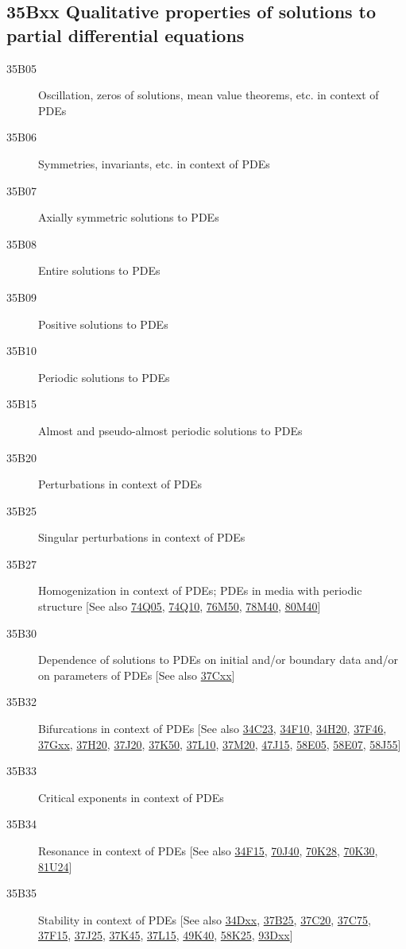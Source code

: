 \subsection*{35Bxx  Qualitative properties of solutions to partial differential equations }\label{35Bxx}
\begin{description}  
\item [35B05]\label{35B05} Oscillation, zeros of solutions, mean value theorems, etc. in context of PDEs
\item [35B06]\label{35B06} Symmetries, invariants, etc. in context of PDEs 
\item [35B07]\label{35B07} Axially symmetric solutions to PDEs
\item [35B08]\label{35B08} Entire solutions to PDEs
\item [35B09]\label{35B09} Positive solutions to PDEs
\item [35B10]\label{35B10} Periodic solutions  to PDEs
\item [35B15]\label{35B15} Almost and pseudo-almost periodic solutions to PDEs
\item [35B20]\label{35B20} Perturbations in context of PDEs
\item [35B25]\label{35B25} Singular perturbations in context of PDEs
\item [35B27]\label{35B27} Homogenization in context of PDEs; PDEs in media with periodic structure [See also \hyperref[74Q05]{74Q05}, \hyperref[74Q10]{74Q10}, \hyperref[76M50]{76M50}, \hyperref[78M40]{78M40}, \hyperref[80M40]{80M40}]
\item [35B30]\label{35B30} Dependence of solutions to PDEs on initial and/or boundary data and/or on parameters of PDEs [See also \hyperref[37Cxx]{37Cxx}]
\item [35B32]\label{35B32} Bifurcations  in context of PDEs [See also \hyperref[34C23]{34C23}, \hyperref[34F10]{34F10}, \hyperref[34H20]{34H20}, \hyperref[37F46]{37F46}, \hyperref[37Gxx]{37Gxx}, \hyperref[37H20]{37H20},  \hyperref[37J20]{37J20}, \hyperref[37K50]{37K50}, \hyperref[37L10]{37L10}, \hyperref[37M20]{37M20}, \hyperref[47J15]{47J15}, \hyperref[58E05]{58E05}, \hyperref[58E07]{58E07}, \hyperref[58J55]{58J55}]
\item [35B33]\label{35B33} Critical exponents in context of PDEs
\item [35B34]\label{35B34} Resonance in context of PDEs [See also \hyperref[34F15]{34F15}, \hyperref[70J40]{70J40}, \hyperref[70K28]{70K28}, \hyperref[70K30]{70K30}, \hyperref[81U24]{81U24}]
\item [35B35]\label{35B35} Stability in context of PDEs [See also \hyperref[34Dxx]{34Dxx}, \hyperref[37B25]{37B25}, \hyperref[37C20]{37C20}, \hyperref[37C75]{37C75}, \hyperref[37F15]{37F15}, \hyperref[37J25]{37J25}, \hyperref[37K45]{37K45}, \hyperref[37L15]{37L15}, \hyperref[49K40]{49K40}, \hyperref[58K25]{58K25}, \hyperref[93Dxx]{93Dxx}]

\end{description}
